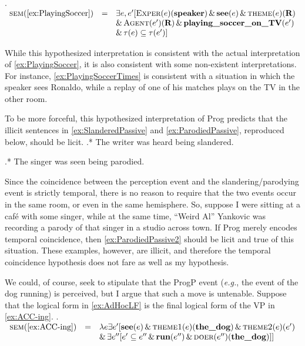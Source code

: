 \ex.\label{ex:PlayingSoccerTimes} 
$\begin{array}{rcl}
	\textsc{sem}(\cref{ex:PlayingSoccer}) & =  & \exists e, e^{\prime} [\textsc{Exper}(e)(\textbf{speaker}) \,\&\, \textbf{see}(e) \,\&\, \textsc{theme}(e)(\textbf{R})\\
	& & \&\, \textsc{Agent}(e^{\prime})(\textbf{R}) \,\&\, \textbf{playing\_soccer\_on\_TV}(e^{\prime})\\
	& & \&\, \tau(e) \subseteq \tau(e^{\prime})] 
\end{array}$

While this hypothesized interpretation is consistent with the actual interpretation of \cref{ex:PlayingSoccer}, it is also consistent with some non-existent interpretations.
For instance, \cref{ex:PlayingSoccerTimes} is consistent with a situation in which the speaker sees Ronaldo, while a replay of one of his matches plays on the TV in the other room.

To be more forceful, this hypothesized interpretation of Prog predicts that the illicit sentences in \cref{ex:SlanderedPassive} and \cref{ex:ParodiedPassive}, reproduced below, should be licit.
\ex.* The writer was heard being slandered.\label{ex:SlanderedPassive22}

\ex.* The singer was seen being parodied.\label{ex:ParodiedPassive2}

Since the coincidence between the perception event and the slandering/parodying event is strictly temporal, there is no reason to require that the two events occur in the same room, or even in the same hemisphere.
So, suppose I were sitting at a caf\'e with some singer, while at the same time, ``Weird Al'' Yankovic was recording a parody of that singer in a studio across town.
If Prog merely encodes temporal coincidence, then \cref{ex:ParodiedPassive2} should be licit and true of this situation.
These examples, however, are illicit, and therefore the temporal coincidence hypothesis does not fare as well as my hypothesis.

We could, of course, seek to stipulate that the ProgP event (\textit{e.g.}, the event of the dog running) is perceived, but I argue that such a move is untenable.
Suppose that the logical form in \cref{ex:AdHocLF} is the final logical form of the VP in \cref{ex:ACC-ing}.
\ex.\label{ex:AdHocLF}
$
\begin{array}[t]{rcl}
	\textsc{sem}(\text{\cref{ex:ACC-ing}}) & = & \lambda e \exists e^{\prime} [ \textbf{see}(e) \,\&\, \textsc{theme1}(e)(\textbf{the\_dog}) \,\&\, \textsc{theme2}(e)(e^{\prime})\\
	& & \&\, \exists e^{\prime\prime}[ e^{\prime} \subseteq e^{\prime\prime} \,\&\, \textbf{run}(e^{\prime\prime}) \,\&\, \textsc{doer}(e^{\prime\prime})(\textbf{the\_dog})]]
\end{array}
$

